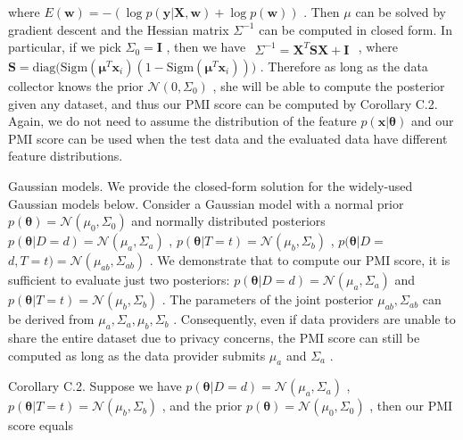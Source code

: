 where
\(E ( \mathbf { w } ) = - ( \log p ( \mathbf { y } | \mathbf { X } , \mathbf { w } ) + \log p ( \mathbf { w } ) )\)
. Then \(\mu\) can be solved by gradient descent and the Hessian matrix
\(\Sigma ^ { - 1 }\) can be computed in closed form. In particular, if
we pick \(\Sigma _ { 0 } = \mathbf { I }\) , then we have
\(\begin{array} { r } { \Sigma ^ { - 1 } = \mathbf { X } ^ { T } \mathbf { S } \mathbf { X } + \mathbf { I } } \end{array}\)
, where
\(\mathbf { S } = \mathrm { d i a g } \big ( \mathrm { S i g m } ( { \boldsymbol { \mu } } ^ { T } \mathbf { x } _ { i } ) ( 1 - \mathrm { S i g m } ( { \boldsymbol { \mu } } ^ { T } \mathbf { x } _ { i } ) ) \big )\)
. Therefore as long as the data collector knows the prior
\(\mathcal { N } ( 0 , \Sigma _ { 0 } )\) , she will be able to compute
the posterior given any dataset, and thus our PMI score can be computed
by Corollary C.2. Again, we do not need to assume the distribution of
the feature \(p ( \mathbf { x } | \mathbf { \boldsymbol { \theta } } )\)
and our PMI score can be used when the test data and the evaluated data
have different feature distributions.

Gaussian models. We provide the closed-form solution for the widely-used
Gaussian models below. Consider a Gaussian model with a normal prior
\(p ( \pmb \theta ) = \mathcal { N } ( \mu _ { 0 } , \Sigma _ { 0 } )\)
and normally distributed posteriors
\(p ( \pmb \theta | D = d ) = \mathcal { N } ( \mu _ { a } , \Sigma _ { a } )\)
,
\(p ( \pmb { \theta } | T = t ) = \mathcal { N } ( \mu _ { b } , \Sigma _ { b } )\)
, \(p ( \pmb \theta | D =\)
\(d , T = t ) = \mathcal { N } ( \mu _ { a b } , \Sigma _ { a b } )\) .
We demonstrate that to compute our PMI score, it is sufficient to
evaluate just two posteriors:
\(p ( \pmb \theta | D = d ) = \mathcal { N } ( \mu _ { a } , \Sigma _ { a } )\)
and
\(p ( \pmb { \theta } | T = t ) = \mathcal { N } ( \mu _ { b } , \Sigma _ { b } )\)
. The parameters of the joint posterior
\(\mu _ { a b } , \Sigma _ { a b }\) can be derived from
\(\mu _ { a } , \Sigma _ { a } , \mu _ { b } , \Sigma _ { b }\) .
Consequently, even if data providers are unable to share the entire
dataset due to privacy concerns, the PMI score can still be computed as
long as the data provider submits \(\mu _ { a }\) and \(\Sigma _ { a }\)
.

Corollary C.2. Suppose we have
\(p ( \pmb \theta | D = d ) = \mathcal N ( \mu _ { a } , \Sigma _ { a } )\)
,
\(p ( \pmb { \theta } | T = t ) = \mathcal { N } ( \mu _ { b } , \Sigma _ { b } )\)
, and the prior
\(p ( \pmb \theta ) = \mathcal { N } ( \mu _ { 0 } , \Sigma _ { 0 } )\)
, then our PMI score equals

